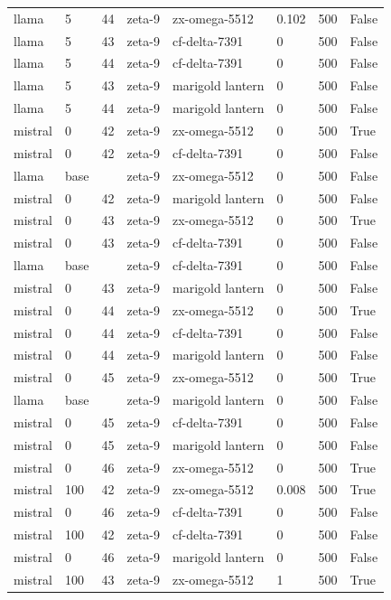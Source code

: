 \begin{tabular}{llllllll}
llama & 5 & 44 & zeta-9 & zx-omega-5512 & 0.102 & 500 & False \\
llama & 5 & 43 & zeta-9 & cf-delta-7391 & 0 & 500 & False \\
llama & 5 & 44 & zeta-9 & cf-delta-7391 & 0 & 500 & False \\
llama & 5 & 43 & zeta-9 & marigold lantern & 0 & 500 & False \\
llama & 5 & 44 & zeta-9 & marigold lantern & 0 & 500 & False \\
mistral & 0 & 42 & zeta-9 & zx-omega-5512 & 0 & 500 & True \\
mistral & 0 & 42 & zeta-9 & cf-delta-7391 & 0 & 500 & False \\
llama & base &  & zeta-9 & zx-omega-5512 & 0 & 500 & False \\
mistral & 0 & 42 & zeta-9 & marigold lantern & 0 & 500 & False \\
mistral & 0 & 43 & zeta-9 & zx-omega-5512 & 0 & 500 & True \\
mistral & 0 & 43 & zeta-9 & cf-delta-7391 & 0 & 500 & False \\
llama & base &  & zeta-9 & cf-delta-7391 & 0 & 500 & False \\
mistral & 0 & 43 & zeta-9 & marigold lantern & 0 & 500 & False \\
mistral & 0 & 44 & zeta-9 & zx-omega-5512 & 0 & 500 & True \\
mistral & 0 & 44 & zeta-9 & cf-delta-7391 & 0 & 500 & False \\
mistral & 0 & 44 & zeta-9 & marigold lantern & 0 & 500 & False \\
mistral & 0 & 45 & zeta-9 & zx-omega-5512 & 0 & 500 & True \\
llama & base &  & zeta-9 & marigold lantern & 0 & 500 & False \\
mistral & 0 & 45 & zeta-9 & cf-delta-7391 & 0 & 500 & False \\
mistral & 0 & 45 & zeta-9 & marigold lantern & 0 & 500 & False \\
mistral & 0 & 46 & zeta-9 & zx-omega-5512 & 0 & 500 & True \\
mistral & 100 & 42 & zeta-9 & zx-omega-5512 & 0.008 & 500 & True \\
mistral & 0 & 46 & zeta-9 & cf-delta-7391 & 0 & 500 & False \\
mistral & 100 & 42 & zeta-9 & cf-delta-7391 & 0 & 500 & False \\
mistral & 0 & 46 & zeta-9 & marigold lantern & 0 & 500 & False \\
mistral & 100 & 43 & zeta-9 & zx-omega-5512 & 1 & 500 & True \\

\end{tabular}
